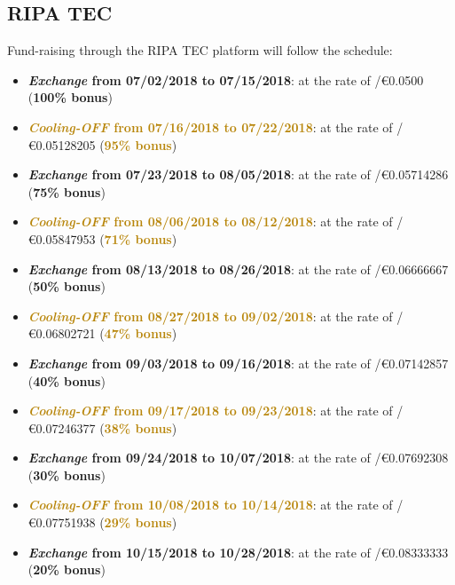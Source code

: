 \documentclass[11pt,fleqn,oneside]{book} %
\begin{document}
\subsection{RIPA TEC}
Fund-raising through the RIPA TEC platform will follow the schedule:
\begin{itemize}
	\item \textcolor{airforceblue}{\textbf{\textit{Exchange} from 07/02/2018 to 07/15/2018}}: at the rate of \PHP/\euro0.0500 (\textcolor{airforceblue}{\textbf{100\% bonus}})
	\item \textcolor{darkgoldenrod}{\textbf{\textit{Cooling-OFF} from 07/16/2018 to 07/22/2018}}: 
	at the rate of \PHP/\euro0.05128205 (\textcolor{darkgoldenrod}{\textbf{95\% bonus}})
	\item \textcolor{airforceblue}{\textbf{\textit{Exchange} from 07/23/2018 to 08/05/2018}}: at the rate of \PHP/\euro0.05714286 (\textcolor{airforceblue}{\textbf{75\% bonus}})
	\item \textcolor{darkgoldenrod}{\textbf{\textit{Cooling-OFF} from 08/06/2018 to 08/12/2018}}: 
	at the rate of \PHP/\euro0.05847953 (\textcolor{darkgoldenrod}{\textbf{71\% bonus}})
	\item \textcolor{airforceblue}{\textbf{\textit{Exchange} from 08/13/2018 to 08/26/2018}}: at the rate of \PHP/\euro0.06666667 (\textcolor{airforceblue}{\textbf{50\% bonus}})
	\item \textcolor{darkgoldenrod}{\textbf{\textit{Cooling-OFF} from 08/27/2018 to 09/02/2018}}: 
	at the rate of \PHP/\euro0.06802721 (\textcolor{darkgoldenrod}{\textbf{47\% bonus}})
	\item \textcolor{airforceblue}{\textbf{\textit{Exchange} from 09/03/2018 to 09/16/2018}}: at the rate of \PHP/\euro0.07142857 (\textcolor{airforceblue}{\textbf{40\% bonus}})
	\item \textcolor{darkgoldenrod}{\textbf{\textit{Cooling-OFF} from 09/17/2018 to 09/23/2018}}: 
	at the rate of \PHP/\euro0.07246377 (\textcolor{darkgoldenrod}{\textbf{38\% bonus}})
	\item \textcolor{airforceblue}{\textbf{\textit{Exchange} from 09/24/2018 to 10/07/2018}}: at the rate of \PHP/\euro0.07692308 (\textcolor{airforceblue}{\textbf{30\% bonus}})
	\item \textcolor{darkgoldenrod}{\textbf{\textit{Cooling-OFF} from 10/08/2018 to 10/14/2018}}: 
	at the rate of \PHP/\euro0.07751938 (\textcolor{darkgoldenrod}{\textbf{29\% bonus}})
	\item \textcolor{airforceblue}{\textbf{\textit{Exchange} from 10/15/2018 to 10/28/2018}}: at the rate of \PHP/\euro0.08333333 (\textcolor{airforceblue}{\textbf{20\% bonus}})

\end{itemize}
\end{document}
